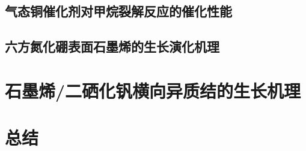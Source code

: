     \begin{figure}[htb]
        
    \end{figure}

    \subsection{气态铜催化剂对甲烷裂解反应的催化性能}
    \subsection{六方氮化硼表面石墨烯的生长演化机理}
\section{石墨烯/二硒化钒横向异质结的生长机理}
\section{总结}